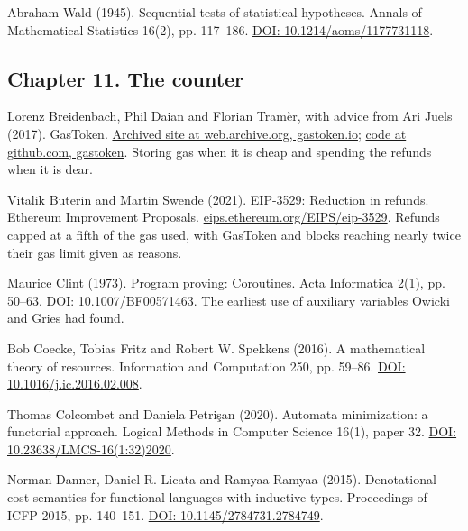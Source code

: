\documentclass[11pt,twoside]{article}
\theoremstyle{thielethm}
\theoremstyle{thieledef}
\theoremstyle{thieledef}
\theoremstyle{thieledef}
\theoremstyle{thielethm}
\theoremstyle{thieleobs}
\theoremstyle{thielethm}
\begin{document}
\noindent Abraham Wald (1945). Sequential tests of statistical hypotheses. Annals of Mathematical Statistics 16(2), pp. 117--186. \href{https://doi.org/10.1214/aoms/1177731118}{DOI: 10.1214/aoms/1177731118}.
\par\medskip

\subsection*{Chapter 11. The counter}

\noindent Lorenz Breidenbach, Phil Daian and Florian Tram\`er, with advice from Ari Juels (2017). GasToken. \href{http://web.archive.org/web/20180308200043/https://gastoken.io/}{Archived site at web.archive.org, gastoken.io}; \href{https://github.com/projectchicago/gastoken}{code at github.com, gastoken}. Storing gas when it is cheap and spending the refunds when it is dear.
\par\medskip

\noindent Vitalik Buterin and Martin Swende (2021). EIP-3529: Reduction in refunds. Ethereum Improvement Proposals. \href{https://eips.ethereum.org/EIPS/eip-3529}{eips.ethereum.org/EIPS/eip-3529}. Refunds capped at a fifth of the gas used, with GasToken and blocks reaching nearly twice their gas limit given as reasons.
\par\medskip

\noindent Maurice Clint (1973). Program proving: Coroutines. Acta Informatica 2(1), pp. 50--63. \href{https://doi.org/10.1007/BF00571463}{DOI: 10.1007/BF00571463}. The earliest use of auxiliary variables Owicki and Gries had found.
\par\medskip

\noindent Bob Coecke, Tobias Fritz and Robert W. Spekkens (2016). A mathematical theory of resources. Information and Computation 250, pp. 59--86. \href{https://doi.org/10.1016/j.ic.2016.02.008}{DOI: 10.1016/j.ic.2016.02.008}.
\par\medskip

\noindent Thomas Colcombet and Daniela Petri\c{s}an (2020). Automata minimization: a functorial approach. Logical Methods in Computer Science 16(1), paper 32. \href{https://doi.org/10.23638/LMCS-16(1:32)2020}{DOI: 10.23638/LMCS-16(1:32)2020}.
\par\medskip

\noindent Norman Danner, Daniel R. Licata and Ramyaa Ramyaa (2015). Denotational cost semantics for functional languages with inductive types. Proceedings of ICFP 2015, pp. 140--151. \href{https://doi.org/10.1145/2784731.2784749}{DOI: 10.1145/2784731.2784749}.
\par\medskip
\end{document}
